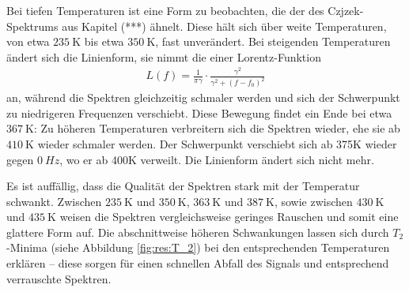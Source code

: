 Bei tiefen Temperaturen ist eine Form zu beobachten, die der des Czjzek-Spektrums aus Kapitel (***) ähnelt. Diese hält sich über weite Temperaturen, von etwa $\SI{235}{\kelvin}$ bis etwa $\SI{350}{\kelvin}$, fast unverändert. Bei steigenden Temperaturen ändert sich die Linienform, sie nimmt die einer Lorentz-Funktion
\begin{align}
	L(f) = \frac{1}{\pi \gamma} \cdot \frac{\gamma^2}{\gamma^2 + (f - f_0)^2} \label{eqn:res:lorentz}
\end{align}
an, während die Spektren gleichzeitig schmaler werden und sich der Schwerpunkt zu niedrigeren Frequenzen verschiebt. Diese Bewegung findet ein Ende bei etwa $\SI{367}{\kelvin}$: Zu höheren Temperaturen verbreitern sich die Spektren wieder, ehe sie ab $\SI{410}{\kelvin}$ wieder schmaler werden. Der Schwerpunkt verschiebt sich ab 375K wieder gegen $\SI{0}{Hz}$, wo er ab 400K verweilt. Die Linienform ändert sich nicht mehr.

Es ist auffällig, dass die Qualität der Spektren stark mit der Temperatur schwankt. Zwischen $\SI{235}{\kelvin}$ und $\SI{350}{\kelvin}$, $\SI{363}{\kelvin}$ und $\SI{387}{\kelvin}$, sowie zwischen $\SI{430}{\kelvin}$ und $\SI{435}{\kelvin}$ weisen die Spektren vergleichsweise geringes Rauschen und somit eine glattere Form auf. Die abschnittweise höheren Schwankungen lassen sich durch $T_2$-Minima (siehe Abbildung \ref{fig:res:T_2}) bei den entsprechenden Temperaturen erklären -- diese sorgen für einen schnellen Abfall des Signals und entsprechend verrauschte Spektren.


